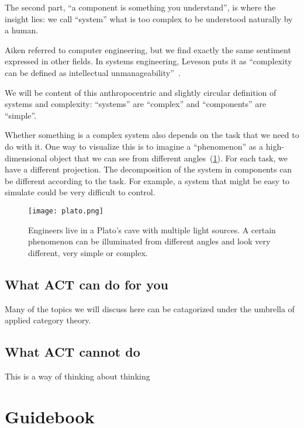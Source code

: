 The second part, ``a component is something you understand'', is where the insight lies: we call ``system'' what is too complex to be understood naturally by a human.

Aiken referred to computer engineering, but we find exactly the same sentiment expressed in other fields. In systems engineering, Leveson puts it as ``complexity can be defined as intellectual unmanageability''~\cite{leveson12engineering}.

We will be content of this anthropocentric and slightly circular definition of systems and
complexity: ``systems'' are ``complex'' and ``components'' are ``simple''.

Whether something is a complex system also depends on the task that we need to do with it. One
way to visualize this is to imagine a ``phenomenon'' as a high-dimensional object that we can see
from different angles~(\cref{fig:aspects}). For each task, we have a different
projection. The decomposition of the system in components can be different according to the
task. For example, a system that might be easy to simulate could be very difficult to control.

\begin{figure}[h]
  \centering
  \texttt{[image: plato.png]}
  \caption{
    Engineers live in a Plato's cave with multiple light sources.
    A certain phenomenon can be illuminated from different angles
    and look very different, very simple or complex.
  }
  \label{fig:aspects}
\end{figure}


\subsection{What ACT can do for you}

Many of the topics we will discuss here can be catagorized under the umbrella
of applied category theory.


\subsection{What ACT cannot do}

This is a way of thinking about thinking



\section{Guidebook}

